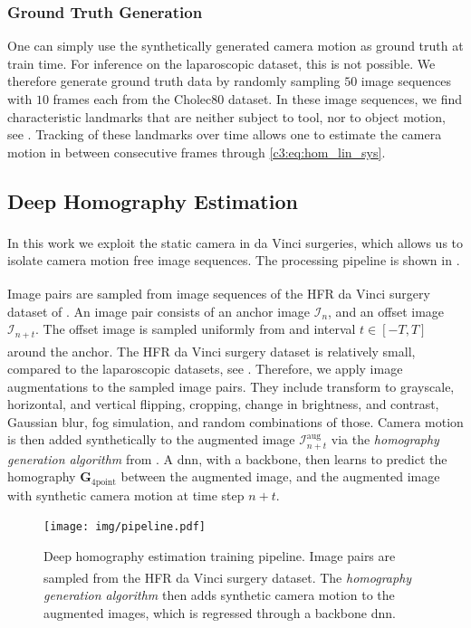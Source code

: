 \subsubsection{Ground Truth Generation}
\label{c3:sec:gt_gen}
One can simply use the synthetically generated camera motion as ground truth at train time. For inference on the laparoscopic dataset, this is not possible. We therefore generate ground truth data by randomly sampling $50$ image sequences with $10$ frames each from the Cholec80 dataset. In these image sequences, we find characteristic landmarks that are neither subject to tool, nor to object motion, see . Tracking of these landmarks over time allows one to estimate the camera motion in between consecutive frames through \eqref{c3:eq:hom_lin_sys}.

\subsection{Deep Homography Estimation}

In this work we exploit the static camera in da Vinci\textsuperscript{\textregistered} surgeries, which allows us to isolate camera motion free image sequences. The processing pipeline is shown in .

Image pairs are sampled from image sequences of the HFR da Vinci\textsuperscript{\textregistered} surgery dataset of . An image pair consists of an anchor image $\mathcal{I}_n$, and an offset image $\mathcal{I}_{n+t}$. The offset image is sampled uniformly from and interval $t\in[-T,T]$ around the anchor. The HFR da Vinci\textsuperscript{\textregistered} surgery dataset is relatively small, compared to the laparoscopic datasets, see . Therefore, we apply image augmentations to the sampled image pairs. They include transform to grayscale, horizontal, and vertical flipping, cropping, change in brightness, and contrast, Gaussian blur, fog simulation, and random combinations of those. Camera motion is then added synthetically to the augmented image $\mathcal{I}^\text{aug}_{n+t}$ via the \textit{homography generation algorithm} from . A \acrshort{dnn}, with a backbone, then learns to predict the homography $\mathbf{G}_{4\text{point}}$ between the augmented image, and the augmented image with synthetic camera motion at time step $n+t$.

\begin{figure}[tb]
    \centering
    \texttt{[image: img/pipeline.pdf]}
    \caption{Deep homography estimation training pipeline. Image pairs are sampled from the HFR da Vinci\textsuperscript{\textregistered} surgery dataset. The \textit{homography generation algorithm} then adds synthetic camera motion to the augmented images, which is regressed through a backbone \acrshort{dnn}.}
    \label{c3:fig:hom}
\end{figure}

